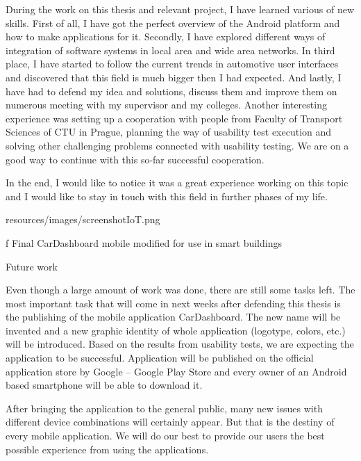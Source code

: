 During the work on this thesis and relevant project, I have learned various of new skills. First of all, I have got the perfect overview of the Android platform and how to make applications for it. Secondly, I have explored different ways of integration of software systems in local area and wide area networks. In third place, I have started to follow the current trends in automotive user interfaces and discovered that this field is much bigger then I had expected. And lastly, I have had to defend my idea and solutions, discuss them and improve them on numerous meeting with my supervisor and my colleges. Another interesting experience was setting up a cooperation with people from Faculty of Transport Sciences of CTU in Prague, planning the way of usability test execution and solving other challenging problems connected with usability testing. We are on a good way to continue with this so-far successful cooperation.

In the end, I would like to notice it was a great experience working on this topic and I would like to stay in touch with this field in further phases of my life.

\midinsert {}
\picw=10cm \cinspic resources/images/screenshotIoT.png 
\caption/f Final CarDashboard mobile modified for use in smart buildings
\endinsert


\sec Future work

Even though a large amount of work was done, there are still some tasks left. The most important task that will come in next weeks after defending this thesis is the publishing of the mobile application CarDashboard. The new name will be invented and a new graphic identity of whole application (logotype, colors, etc.) will be introduced. Based on the results from usability tests, we are expecting the application to be successful. Application will be published on the official application store by Google -- Google Play Store and every owner of an Android based smartphone will be able to download it.

After bringing the application to the general public, many new issues with different device combinations will certainly appear. But that is the destiny of every mobile application. We will do our best to provide our users the best possible experience from using the applications.





